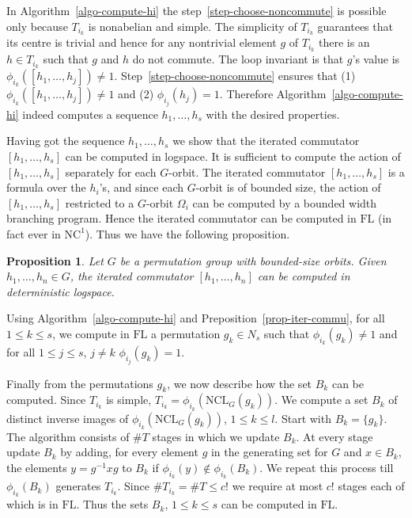 \documentclass[11pt]{madras}%
\newtheorem{proposition}[theorem]{Proposition}
\theoremstyle{remark}
\newcommand{\NCL}[2][]{\ensuremath{\mathrm{NCL}_{#1}({#2})}}
\newcommand{\commu}[1]{{\ensuremath{\left\lbrack #1 \right\rbrack}}}
\begin{document}
In Algorithm~\ref{algo-compute-hi} the
step~\ref{step-choose-noncommute} is possible only because $T_{i_k}$
is nonabelian and simple. The simplicity of $T_{i_k}$ guarantees that
its centre is trivial and hence for any nontrivial element $g$ of
$T_{i_k}$ there is an $h \in T_{i_k}$ such that $g$ and $h$ do not
commute. The loop invariant is that $g$'s value is
$\phi_{i_k}([h_1,\ldots,h_j]) \neq 1$.
Step~\ref{step-choose-noncommute} ensures that (1)
$\phi_{i_k}([h_1,\ldots,h_j]) \neq 1$ and (2) $\phi_{i_j}(h_j) = 1$.
Therefore Algorithm~\ref{algo-compute-hi} indeed computes a sequence
$h_1,\ldots,h_s$ with the desired properties.

Having got the sequence $h_1,\ldots,h_s$ we show that the iterated
commutator $\commu{h_1,\ldots,h_s}$ can be computed in logspace.  It
is sufficient to compute the action of $\commu{h_1,\ldots,h_s}$
separately for each $G$-orbit.  The iterated commutator
$\commu{h_1,\ldots,h_s}$ is a formula over the $h_i$'s, and since each
$G$-orbit is of bounded size, the action of $\commu{h_1,\ldots,h_s}$
restricted to a $G$-orbit $\Omega_i$ can be computed by a bounded
width branching program.  Hence the iterated commutator can be
computed in $\mathrm{FL}$ (in fact ever in $\mathrm{NC}^1$). Thus we
have the following proposition.

\begin{proposition}{\label{prop-iter-commu}}
  Let $G$ be a permutation group with bounded-size orbits. Given
  $h_1,\ldots,h_n \in G$, the iterated commutator
  $\commu{h_1,\ldots,h_n}$ can be computed in deterministic logspace.
\end{proposition}

Using Algorithm~\ref{algo-compute-hi} and
Preposition~\ref{prop-iter-commu}, for all $1 \leq k \leq s$, we
compute in $\mathrm{FL}$ a permutation $g_k \in N_s$ such that
$\phi_{i_k}(g_k) \neq 1$ and for all $1 \leq j \leq s$, $j \neq k$
$\phi_{i_j}(g_k) = 1$.

Finally from the permutations $g_k$, we now describe how the set $B_k$
can be computed. Since $T_{i_k}$ is simple, $T_{i_k} = \phi_{i_k}
\left(\NCL[G]{g_k}\right)$.  We compute a set $B_k$ of distinct
inverse images of $\phi_{i_k}(\NCL[G]{g_k})$, $1 \leq k \leq l$.
Start with $B_k = \{ g_k\}$. The algorithm consists of $\# T$ stages
in which we update $B_k$. At every stage update $B_k$ by adding, for
every element $g$ in the generating set for $G$ and $x \in B_k$, the
elements $y = g^{-1} x g$ to $B_k$ if $\phi_{i_k}(y) \not \in
\phi_{i_k}(B_k)$.  We repeat this process till $\phi_{i_k}(B_k)$
generates $T_{i_k}$.  Since $\# T_{i_k} = \# T \leq c!$ we require at
most $c!$ stages each of which is in $\mathrm{FL}$. Thus the sets
$B_k$, $1\leq k \leq s$ can be computed in $\mathrm{FL}$.
\end{document}
